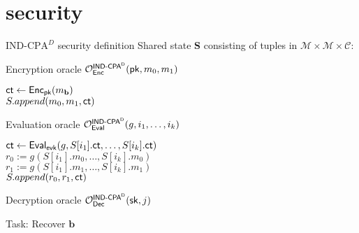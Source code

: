 \documentclass{beamer}
\begin{document}
	\section{\indcpad security}
	
		\begin{frame}{$\text{IND-CPA}^D$ security definition}
		\vspace*{-0.3cm}
		Shared state \textbf{S} consisting of tuples in $\mathcal{M} \times \mathcal{M} \times \mathcal{C}$:
		\begin{algorithm}[H]
			\scriptsize
			\caption{Encryption oracle ${\mathcal O}_{\sf Enc}^\text{\sf IND-CPA$\sf ^D$}({\sf pk}, m_0, m_1)$}
			${\sf ct} \gets {\sf Enc}_{{\sf pk}}(m_\mathbf{b})$\\
			$S.append(m_0, m_1, {\sf ct})$\\
			\Return{$\ct$}
		\end{algorithm}
		\begin{algorithm}[H]
			\scriptsize
			\caption{Evaluation oracle ${\mathcal O}_{\mathsf{Eval}}^\text{\sf IND-CPA$\sf ^D$}(g, i_1, \dots, i_k)$}
			${\sf ct} \gets \mathsf{Eval}_{{\sf evk}}(g, S[i_1].{\sf ct}, \dots, S[i_k].{\sf ct})$\\
			$r_0 := g(S[i_1].m_0, \dots, S[i_k].m_0)$\\
			$r_1 := g(S[i_1].m_1, \dots, S[i_k].m_1)$\\
			$S.append(r_0, r_1, {\sf ct})$\\
			\Return{$\ct$}
		\end{algorithm}
		
		\begin{algorithm}[H]
			\scriptsize
			\caption{Decryption oracle ${\mathcal O}_{\sf Dec}^\text{\sf IND-CPA$\sf ^D$}({\sf sk}, j)$}
		\end{algorithm}
		Task: Recover $\mathbf{b}$
	\end{frame}
\end{document}
